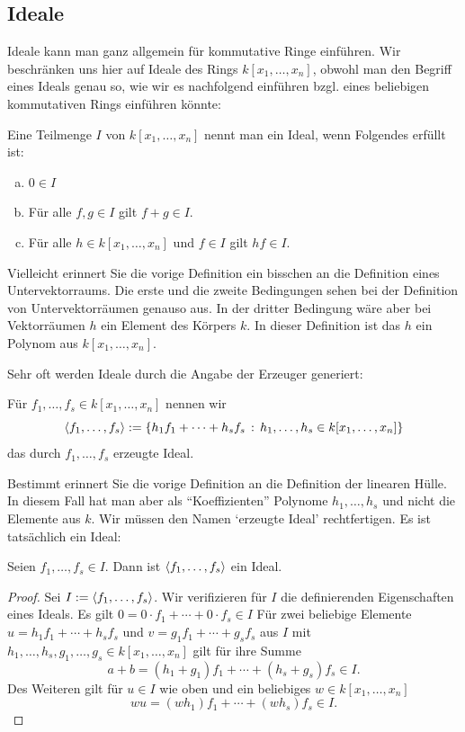 \documentclass[11pt]{article}
\numberwithin{equation}{section}
\begin{document}
\subsection{Ideale} 

Ideale kann man ganz allgemein für kommutative Ringe einführen. Wir beschränken uns hier auf Ideale des Rings $k[x_1,\ldots,x_n]$, obwohl man den Begriff eines Ideals genau so, wie wir es nachfolgend einführen bzgl. eines beliebigen kommutativen Rings einführen könnte: 

\begin{definition} Eine Teilmenge $I$ von $k[x_1,\ldots,x_n]$ nennt man ein Ideal, wenn Folgendes erfüllt ist: 
\begin{enumerate}[(a)]
	\item $0 \in I$
	\item Für alle $f,g \in I$ gilt $f+g \in I$. 
	\item Für alle  $h \in k[x_1,\ldots,x_n]$ und $f \in I$  gilt $hf  \in I$. 
\end{enumerate} 
\end{definition} 

Vielleicht erinnert Sie die vorige Definition ein bisschen an die Definition eines Untervektorraums. Die erste und die zweite Bedingungen sehen bei der Definition von Untervektorräumen genauso aus. In der dritter Bedingung wäre aber bei Vektorräumen $h$ ein Element des Körpers $k$. In dieser Definition ist das $h$ ein Polynom aus $k[x_1,\ldots,x_n]$. 

Sehr oft werden Ideale durch die Angabe der Erzeuger generiert: 

\begin{definition}
	Für $f_1,\ldots,f_s \in k[x_1,\ldots,x_n]$ nennen wir 
	\[
		\left<  f_1,\ldots,f_s \right>  :=  \left\{  h_1 f_1 + \cdots + h_s f_s  \,:\, h_1,\ldots,h_s \in k[x_1,\ldots,x_n] \right\}
	\]
	das durch $f_1,\ldots,f_s$ erzeugte Ideal. 
\end{definition} 

Bestimmt erinnert Sie die vorige Definition an die Definition der linearen Hülle. In diesem Fall hat man aber als ``Koeffizienten'' Polynome $h_1,\ldots,h_s$ und nicht die Elemente aus $k$. Wir müssen den Namen `erzeugte Ideal' rechtfertigen. Es ist tatsächlich ein Ideal: 

\begin{lemma}
	Seien $f_1,\ldots,f_s \in I$. Dann ist $\left< f_1,\ldots,f_s \right>$ ein Ideal. 
\end{lemma} 
\begin{proof} 
	Sei $I := \left< f_1,\ldots,f_s \right>$. Wir verifizieren für $I$ die definierenden Eigenschaften eines Ideals. 
	Es gilt $0 = 0 \cdot f_1 + \cdots + 0 \cdot f_s \in I$
	Für zwei beliebige Elemente $u = h_1 f_1 +  \cdots + h_s f_s$ und $v = g_1 f_1 + \cdots + g_s f_s$ aus $I$ mit $h_1,\ldots,h_s, g_1,\ldots, g_s \in k[x_1,\ldots,x_n]$ gilt für ihre Summe 
	\[
		a + b = (h_1 + g_1) f_1 +  \cdots + (h_s + g_s) f_s \in I. 
	\]
	Des Weiteren gilt für  $u \in I$ wie oben und ein beliebiges $w \in k[x_1,\ldots,x_n]$ 
	\[
		w u = (w h_1) f_1 + \cdots + (w h_s) f_s \in I. 
	\]
\end{proof}
\end{document}
